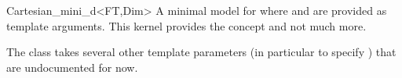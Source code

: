 \begin{ccRefClass}{Cartesian_mini_d<FT,Dim>}
\ccDefinition
A minimal model for  where  and
 are provided as template arguments.
This kernel provides the  concept and not much more.

The class takes several other template parameters (in particular to
specify ) that are undocumented for now.

\ccIsModel
{}

\end{ccRefClass}
